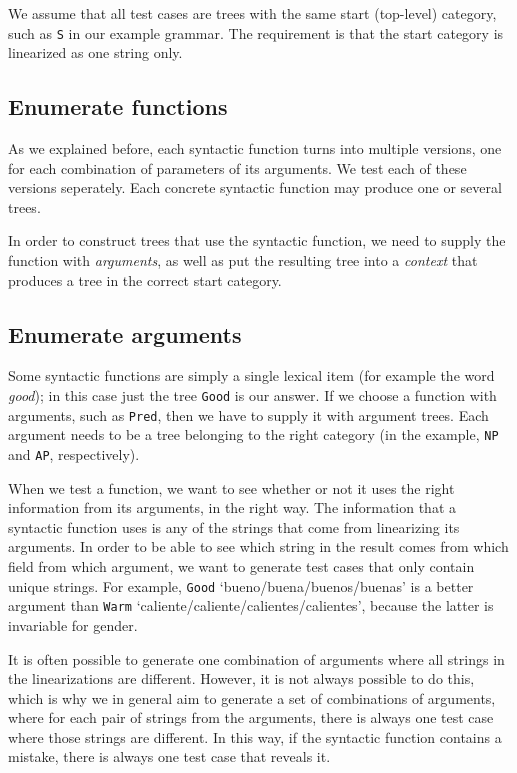 \documentclass[11pt]{article}
\def\t#1{\texttt{#1}}
\begin{document}
We assume that all test cases are trees with the same start
(top-level) category, such as \t{S} in our example grammar. The
requirement is that the start category is linearized as one string only. 

\subsection{Enumerate functions} As we explained before, each syntactic
function turns into multiple versions, one for each combination of
parameters of its arguments. We test each of these versions
seperately. Each concrete syntactic function may produce one or several trees.

In order to construct trees that use the syntactic function, we need
to supply the function with \emph{arguments}, as well as put the resulting tree
into a \emph{context} that produces a tree in the correct start
category.

\subsection{Enumerate arguments} Some syntactic functions are
simply a single lexical item (for example the word \emph{good}); in
this case just the tree \t{Good} is our answer.
If we choose a function with arguments, such as \t{Pred}, then we have
to supply it with argument trees. Each argument needs to be a
tree belonging to the right category (in the example, \t{NP} and
\t{AP}, respectively). 

When we test a function, we want to see whether or not it uses the
right information from its arguments, in the right way. The
information that a syntactic function uses is any of the strings that
come from linearizing its arguments. In order to be able to see which
string in the result comes from which field from which argument, we
want to generate test cases that only contain unique strings.
For example, \t{Good} `bueno/buena/buenos/buenas' is a
better argument than \t{Warm} `caliente/caliente/calientes/calientes',
because the latter is invariable for gender.

It is often possible to generate one combination of arguments where
all strings in the linearizations are different. However, it is not
always possible to do this, which is why we in general aim to generate
a set of combinations of arguments, where for each pair of strings
from the arguments, there is always one test case where those strings
are different. In this way, if the syntactic function contains a
mistake, there is always one test case that reveals it.
\end{document}
